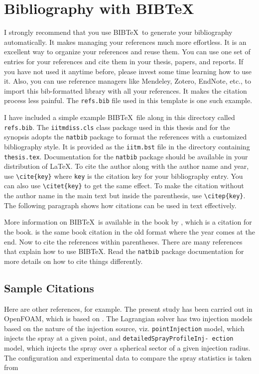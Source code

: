 \section{Bibliography with BIB\TeX}

I strongly recommend that you use BIB\TeX\ to generate your bibliography automatically.  It makes managing your references much more effortless.  It is an excellent way to organize your references and reuse them.  You can use one set of entries for your references and cite them in your thesis, papers, and reports.  If you have not used it anytime before, please invest some time learning how to use it. Also, you can use reference managers like Mendeley, Zotero, EndNote, etc., to import this bib-formatted library with all your references. It makes the citation process less painful. The \verb+refs.bib+ file used in this template is one such example.

I have included a simple example BIB\TeX\ file along in this directory called \verb+refs.bib+.  The \verb+iitmdiss.cls+ class package used in this thesis and for the synopsis adopts the \verb+natbib+ package to format the references with a customized bibliography style. It is provided as the \verb+iitm.bst+ file in the directory containing \verb+thesis.tex+.  Documentation for the \verb+natbib+ package should be available in your distribution of \LaTeX.  To cite the author along with the author name and year, use \verb+\cite{key}+ where \verb+key+ is the citation key for your bibliography entry.  You can also use \verb+\citet{key}+ to get the same effect.  To make the citation without the author name in the main text but inside the parenthesis, use \verb+\citep{key}+.  The following paragraph shows how citations can be used in text effectively.

More information on BIB\TeX\ is available in the book by \cite{lamport:86}, which is a citation for the book. \cite{lamport1:86} is the same book citation in the old format where the year comes at the end. Now to cite the references within parentheses. There are many references~\citep{lamport:86} that explain how to use BIB\TeX.  Read the \verb+natbib+ package documentation for more details on how to cite things differently.

\subsection{Sample Citations}

Here are other references, for example.  The present study has been carried out in OpenFOAM, which is based on \cite{Weller1998}. The Lagrangian solver has two injection models based on the nature of the injection source, viz. \texttt{pointInjection} model, which injects the spray at a given point, and \texttt{detailedSprayProfileInj- ection} model, which injects the spray over a spherical sector of a given injection radius. The configuration and experimental data to compare the spray statistics is taken from \cite{Zhou2015a}

